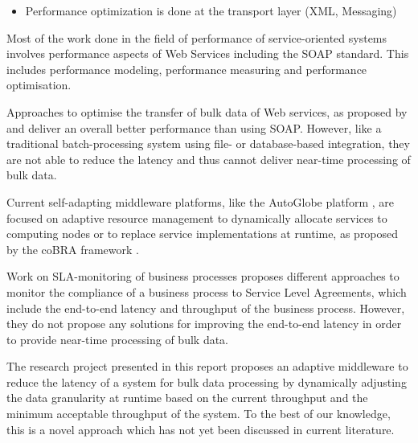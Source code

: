 \begin{itemize}
  \item Performance optimization is done at the transport layer (XML, Messaging)
\end{itemize}

Most of the work done in the field of performance of service-oriented systems involves performance aspects of Web Services including the SOAP standard. This includes performance modeling, performance measuring and performance optimisation. 

Approaches to optimise the transfer of bulk data of Web services, as proposed by \citet{Wichaiwong:2007oq} and  \citet{Habich:2007ij} deliver an overall better performance than using SOAP. However, like a traditional batch-processing system using file- or database-based integration, they are not able to reduce the latency and thus cannot deliver near-time processing of bulk data.

Current self-adapting middleware platforms, like the AutoGlobe platform \citep{Gmach:2008vo}, are focused on adaptive resource management to dynamically allocate services to computing nodes or to replace service implementations at runtime, as proposed by the coBRA framework \citep{Irmert:2008nx}.

Work on SLA-monitoring of business processes proposes different approaches to monitor the compliance of a business process to Service Level Agreements, which include the end-to-end latency and throughput of the business process. However, they do not propose any solutions for improving the end-to-end latency in order to provide near-time processing of bulk data.

The research project presented in this report proposes an adaptive middleware to reduce the latency of a system for bulk data processing by dynamically adjusting the data granularity at runtime based on the current throughput and the minimum acceptable throughput of the system. To the best of our knowledge, this is a novel approach which has not yet been discussed in current literature.